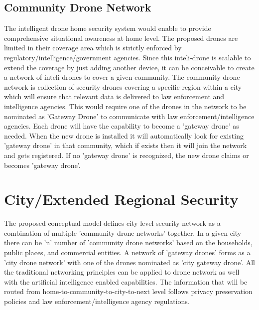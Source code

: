 \documentclass[sigconf]{acmart}
\begin{document}
\subsection{Community Drone Network}
The intelligent drone home security system would enable to provide comprehensive situational awareness at home level. The proposed drones are limited in their coverage area which is strictly enforced by regulatory/intelligence/government agencies. Since this inteli-drone is scalable to extend the coverage by just adding another device, it can be conceivable to create a network of inteli-drones to cover a given community. The community drone network is collection of security drones covering a specific region within a city which will ensure that relevant data is delivered to law enforcement and intelligence agencies. This would require one of the drones in the network to be nominated as 'Gateway Drone' to communicate with law enforcement/intelligence agencies. Each drone will have the capability to become a 'gateway drone' as needed. When the new drone is installed it will automatically look for existing 'gateway drone' in that community, which if exists then it will join the network and gets registered. If no 'gateway drone' is recognized, the new drone claims or becomes 'gateway drone'.

\section{City/Extended Regional Security}
The proposed conceptual model defines city level security network as a combination of multiple 'community drone networks' together. In a given city there can be 'n' number of 'community drone networks' based on the households, public places, and commercial entities. A network of 'gateway drones' forms as a 'city drone network' with one of the drones nominated as 'city gateway drone'.
All the traditional networking principles can be applied to drone network as well with the artificial intelligence enabled capabilities.
The information that will be routed from home-to-community-to-city-to-next level follows privacy preservation policies and law enforcement/intelligence agency regulations.
\end{document}
